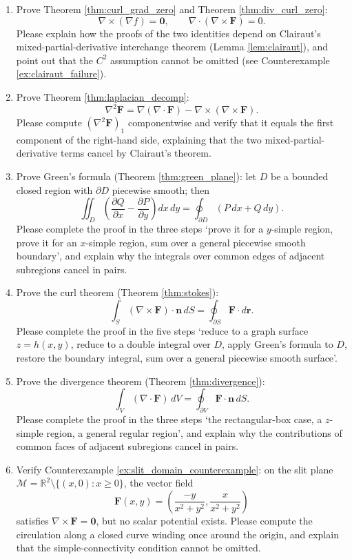 \begin{enumerate}[leftmargin=3em, label=\textbf{Exercise \arabic*}]
    \item Prove Theorem \ref{thm:curl_grad_zero} and Theorem \ref{thm:div_curl_zero}:
    \[
    \nabla\times(\nabla f)=\mathbf{0},\qquad
    \nabla\cdot(\nabla\times\mathbf{F})=0.
    \]
    Please explain how the proofs of the two identities depend on Clairaut's mixed-partial-derivative interchange theorem (Lemma \ref{lem:clairaut}),
    and point out that the $C^2$ assumption cannot be omitted (see Counterexample \ref{ex:clairaut_failure}).

    \item Prove Theorem \ref{thm:laplacian_decomp}:
    \[
    \nabla^2\mathbf{F}=\nabla(\nabla\cdot\mathbf{F})-\nabla\times(\nabla\times\mathbf{F}).
    \]
    Please compute $(\nabla^2\mathbf{F})_1$ componentwise and verify that it equals the first component of the right-hand side,
    explaining that the two mixed-partial-derivative terms cancel by Clairaut's theorem.

    \item Prove Green's formula (Theorem \ref{thm:green_plane}):
    let $D$ be a bounded closed region with $\partial D$ piecewise smooth; then
    \[
    \iint_D\left(\frac{\partial Q}{\partial x}-\frac{\partial P}{\partial y}\right)dx\,dy
    =\oint_{\partial D}(P\,dx+Q\,dy).
    \]
    Please complete the proof in the three steps `prove it for a $y$-simple region, prove it for an $x$-simple region, sum over a general piecewise smooth boundary',
    and explain why the integrals over common edges of adjacent subregions cancel in pairs.

    \item Prove the curl theorem (Theorem \ref{thm:stokes}):
    \[
    \int_S(\nabla\times\mathbf{F})\cdot\mathbf{n}\,dS
    =\oint_{\partial S}\mathbf{F}\cdot d\mathbf{r}.
    \]
    Please complete the proof in the five steps `reduce to a graph surface $z=h(x,y)$, reduce to a double integral over $D$, apply Green's formula to $D$,
    restore the boundary integral, sum over a general piecewise smooth surface'.

    \item Prove the divergence theorem (Theorem \ref{thm:divergence}):
    \[
    \int_V(\nabla\cdot\mathbf{F})\,dV=\oint_{\partial V}\mathbf{F}\cdot\mathbf{n}\,dS.
    \]
    Please complete the proof in the three steps `the rectangular-box case, a $z$-simple region, a general regular region',
    and explain why the contributions of common faces of adjacent subregions cancel in pairs.

    \item Verify Counterexample \ref{ex:slit_domain_counterexample}:
    on the slit plane $\mathcal{M}=\mathbb{R}^2\setminus\{(x,0):x\ge0\}$,
    the vector field
    \[
    \mathbf{F}(x,y)=\left(\frac{-y}{x^2+y^2},\frac{x}{x^2+y^2}\right)
    \]
    satisfies $\nabla\times\mathbf{F}=\mathbf{0}$, but no scalar potential exists.
    Please compute the circulation along a closed curve winding once around the origin, and explain that the simple-connectivity condition cannot be omitted.


\end{enumerate}
